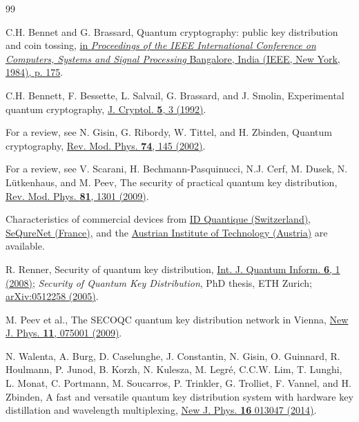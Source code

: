 \documentclass[aps,pra,twocolumn,amsmath,amssymb,nofootinbib,showpacs,superscriptaddress]{revtex4-1}
\begin{document}
\begin{thebibliography}{99}

C.H. Bennet and G. Brassard,
Quantum cryptography: public key distribution and coin tossing,
{\href{https://researcher.watson.ibm.com/researcher/files/us-bennetc/BB84highest.pdf}
{in {\it Proceedings of the IEEE International Conference on Computers, Systems and Signal Processing} Bangalore, India (IEEE, New York, 1984), p. 175}}.

C.H. Bennett, F. Bessette, L. Salvail, G. Brassard, and J. Smolin,
Experimental quantum cryptography,
{\href{https://dx.doi.org/10.1007/BF00191318}{J. Cryptol. {\bf 5}, 3 (1992)}}.
	
For a review, see N. Gisin, G. Ribordy, W. Tittel, and H. Zbinden,
Quantum cryptography,
{\href{https://dx.doi.org/10.1103/RevModPhys.74.145}{Rev. Mod. Phys. {\bf 74}, 145 (2002)}}.

For a review, see V. Scarani, H. Bechmann-Pasquinucci, N.J. Cerf, M. Dusek, N. L\"utkenhaus, and M. Peev,
The security of practical quantum key distribution,
{\href{https://dx.doi.org/10.1103/RevModPhys.81.1301}{Rev. Mod. Phys. {\bf 81}, 1301 (2009)}}.

Characteristics of commercial devices from
{\href{https://www.idquantique.com}{ID Quantique (Switzerland)}},
{\href{https://www.sequrenet.com}{SeQureNet (France)}},
and the {\href{https://www.ait.ac.at/}{Austrian Institute of Technology (Austria)}} are available.

R. Renner, 
Security of quantum key distribution,
{\href{https://dx.doi.org/10.1142/S0219749908003256}{Int. J. Quantum Inform. {\bf 6}, 1 (2008)}};
{\it Security of Quantum Key Distribution},
PhD thesis, ETH Zurich; 
{\href{https://arxiv.org/abs/quant-ph/0512258}{arXiv:0512258 (2005)}}.

M. Peev et al., 
The SECOQC quantum key distribution network in Vienna,
{\href{https://doi.org/10.1088/1367-2630/11/7/075001}{New J. Phys. {\bf 11}, 075001 (2009)}}.
      
N. Walenta, A. Burg, D. Caselunghe, J. Constantin, N. Gisin, O. Guinnard, R. Houlmann, P. Junod, B. Korzh, N. Kulesza, M. Legr\'e, 
C.C.W. Lim, T. Lunghi, L. Monat, C. Portmann, M. Soucarros, P. Trinkler, G. Trolliet, F. Vannel, and H. Zbinden,
A fast and versatile quantum key distribution system with hardware key distillation and wavelength multiplexing,
{\href{https://dx.doi.org/10.1088/1367-2630/16/1/013047}{New J. Phys. {\bf 16} 013047 (2014)}}.


\end{thebibliography}
\end{document}
